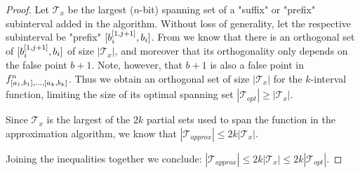 \documentclass{article}
\begin{document}
\begin{proof}
Let $\mathcal{T}_x$ be the largest ($n$-bit) spanning set
of a "suffix" or "prefix" subinterval
added in the algorithm.
Without loss of generality,
let the respective subinterval be "prefix"
$[b_i^{[1, j+1]}, b_i]$.
From \cite[p.~36]{Dubovsky2012} we know that
there is an orthogonal set
of $[b_i^{[1, j+1]}, b_i]$
of size $|\mathcal{T}_x|$,
and moreover that its orthogonality only depends
on the false point $b+1$.
Note, however, that $b+1$ is also a false point in
$f^n_{[a_1, b_1], \ldots, [a_k, b_k]}$.
Thus we obtain an orthogonal set of size $|\mathcal{T}_x|$
for the $k$-interval function,
limiting the size of its optimal spanning set
$|\mathcal{T}_{opt}| \geq |\mathcal{T}_x|$.

Since $\mathcal{T}_x$ is the largest
of the $2k$ partial sets used to span the function
in the approximation algorithm,
we know that
$|\mathcal{T}_{approx}| \leq 2k |\mathcal{T}_x|$.

Joining the inequalities together we conclude:
$|\mathcal{T}_{approx}| \leq 2k |\mathcal{T}_x| \leq
2k |\mathcal{T}_{opt}|$.
\end{proof}



\printglossaries
\end{document}
